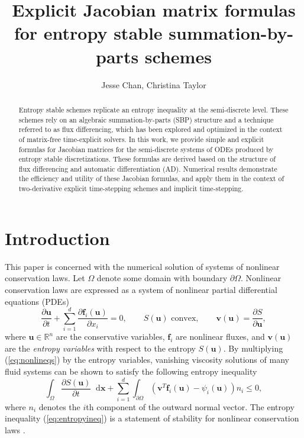 \documentclass{article}
\title{Explicit Jacobian matrix formulas for entropy stable summation-by-parts schemes}
\author{Jesse Chan, Christina Taylor}
\date{}
\newcommand*\diff[1]{\mathop{}\!{\mathrm{d}#1}}
\newcommand{\pd}[2]{\frac{\partial#1}{\partial#2}}
\newcommand{\LRp}[1]{\left( #1 \right)}
\begin{document}
\maketitle

\begin{abstract}
Entropy stable schemes replicate an entropy inequality at the semi-discrete level.  These schemes rely on an algebraic summation-by-parts (SBP) structure and a technique referred to as flux differencing, which has been explored and optimized in the context of matrix-free time-explicit solvers.  In this work, we provide simple and explicit formulas for Jacobian matrices for the semi-discrete systems of ODEs produced by entropy stable discretizations.  These formulas are derived based on the structure of flux differencing and automatic differentiation (AD).  Numerical results demonstrate the efficiency and utility of these Jacobian formulas, and apply them in the context of two-derivative explicit time-stepping schemes and implicit time-stepping.  
\end{abstract}

\section{Introduction}

This paper is concerned with the numerical solution of systems of nonlinear conservation laws.  Let $\Omega$ denote some domain with boundary $\partial \Omega$.  Nonlinear conservation laws are expressed as a system of nonlinear partial differential equations (PDEs) 
\begin{equation}
\pd{\bm{u}}{t}  + \sum_{i=1}^d\pd{\bm{f}_i(\bm{u})}{x_i} = 0, \qquad 
S(\bm{u}) \text{ convex}, \qquad
\bm{v}(\bm{u}) = \pd{S}{\bm{u}},
\label{eq:nonlineqs}
\end{equation}
where $\bm{u}\in \mathbb{R}^n$ are the conservative variables, $\bm{f}_i$ are nonlinear fluxes, and $\bm{v}(\bm{u})$ are the \textit{entropy variables} with respect to the entropy $S(\bm{u})$.  By multiplying (\ref{eq:nonlineqs}) by the entropy variables, vanishing viscosity solutions \cite{kruvzkov1970first} of many fluid systems \cite{hughes1986new, chen2017entropy} can be shown to satisfy the following entropy inequality
\begin{equation}
\int_{\Omega}\pd{S(\bm{u})}{t}\diff{\bm{x}} + \sum_{i=1}^d \int_{\partial \Omega} \LRp{\bm{v}^T\bm{f}_i(\bm{u}) - \psi_i(\bm{u})}n_i \leq 0\label{eq:entropyineq},
\end{equation}
where $n_i$ denotes the $i$th component of the outward normal vector.  The entropy inequality (\ref{eq:entropyineq}) is a statement of stability for nonlinear conservation laws \cite{mock1980systems, harten1983symmetric}.  
\end{document}
